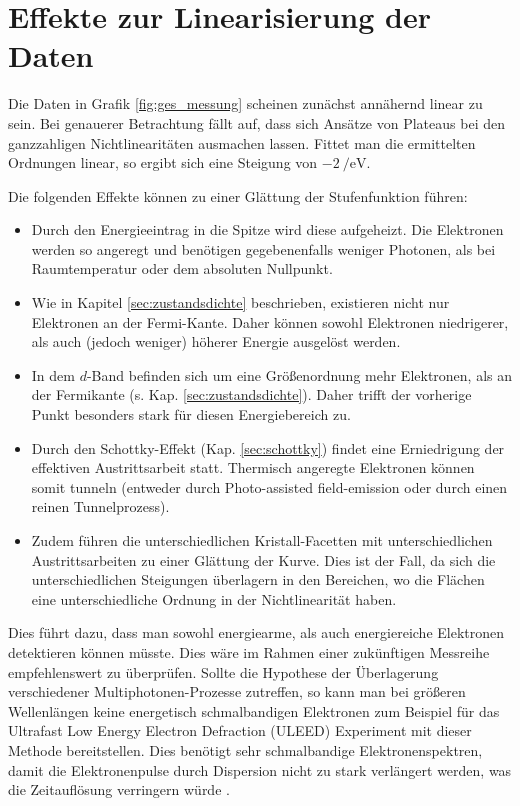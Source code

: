 \documentclass[bachelor,       %
               twoside,        %
               BCOR10mm,       %
               english,ngerman, %
               final,          %
               ]{GAUBM}
\begin{document}
\section{Effekte zur Linearisierung der Daten}
\label{sec:erklaerung_lin}
Die Daten in Grafik \ref{fig:ges_messung} scheinen zunächst annähernd linear zu sein.
Bei genauerer Betrachtung fällt auf, dass sich Ansätze von Plateaus bei den ganzzahligen Nichtlinearitäten ausmachen lassen.
Fittet man die ermittelten Ordnungen linear, so ergibt sich eine Steigung von $\SI{-2}{\per\eV}$.

Die folgenden Effekte können zu einer Glättung der Stufenfunktion führen:
\begin{itemize}
	\item Durch den Energieeintrag in die Spitze wird diese aufgeheizt. Die Elektronen werden so angeregt und benötigen gegebenenfalls weniger Photonen, als bei Raumtemperatur oder dem absoluten Nullpunkt.
	\item Wie in Kapitel \ref{sec:zustandsdichte} beschrieben, existieren nicht nur Elektronen an der Fermi-Kante. Daher können sowohl Elektronen niedrigerer, als auch (jedoch weniger) höherer Energie ausgelöst werden.
	\item In dem $d$-Band befinden sich um eine Größenordnung mehr Elektronen, als an der Fermikante (s. Kap. \ref{sec:zustandsdichte}). Daher trifft der vorherige Punkt besonders stark für diesen Energiebereich zu.
	\item Durch den Schottky-Effekt (Kap. \ref{sec:schottky}) findet eine Erniedrigung der effektiven Austrittsarbeit statt. Thermisch angeregte Elektronen können somit tunneln (entweder durch Photo-assisted field-emission oder durch einen reinen Tunnelprozess).
	\item Zudem führen die unterschiedlichen Kristall-Facetten mit unterschiedlichen Austrittsarbeiten zu einer Glättung der Kurve. Dies ist der Fall, da sich die unterschiedlichen Steigungen überlagern in den Bereichen, wo die Flächen eine unterschiedliche Ordnung in der Nichtlinearität haben.
\end{itemize}

Dies führt dazu, dass man sowohl energiearme, als auch energiereiche Elektronen detektieren können müsste.
Dies wäre im Rahmen einer zukünftigen Messreihe empfehlenswert zu überprüfen.
Sollte die Hypothese der Überlagerung verschiedener Multiphotonen-Prozesse zutreffen, so kann man bei größeren Wellenlängen keine energetisch schmalbandigen Elektronen zum Beispiel für das Ultrafast Low Energy Electron Defraction (ULEED) Experiment mit dieser Methode bereitstellen.
Dies benötigt sehr schmalbandige Elektronenspektren, damit die Elektronenpulse durch Dispersion nicht zu stark verlängert werden, was die Zeitauflösung verringern würde \cite{gahlmann_2008}.
\end{document}
